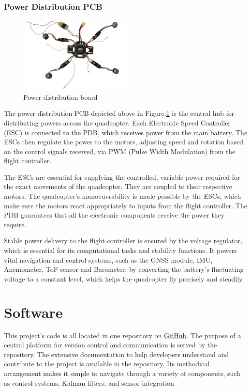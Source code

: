 \documentclass{report}
\begin{document}
\subsection{Power Distribution PCB}
\begin{figure}[H]
  \centering
  \includegraphics[width=0.5\textwidth]{Pictures/power_distribution_and_escs.png}
  \caption{Power distribution board}
  \label{fig:power_distribution}
\end{figure}
The power distribution PCB depicted above in Figure:\ref{fig:power_distribution}
is the central hub for distributing powers across the quadcopter. Each
Electronic Speed Controller (ESC) is connected to the PDB, which receives power
from the main battery. The ESCs then regulate the power to the motors, adjusting
speed and rotation based on the control signals received, via PWM (Pulse Width
Modulation) from the flight controller.

The ESCs are essential for supplying the controlled, variable power required for
the exact movements of the quadcopter. They are coupled to their respective
motors. The quadcopter's manoeuvrability is made possible by the ESCs, which
make sure the motors react appropriately to inputs from the flight controller.
The PDB guarantees that all the electronic components receive the power they
require.

Stable power delivery to the flight controller is ensured by the voltage
regulator, which is essential for its computational tasks and stability
functions. It powers vital navigation and control systems, such as the GNSS
module, IMU, Anemometer, ToF sensor and Barometer, by converting the battery's
fluctuating voltage to a constant level, which helps the quadcopter fly
precisely and steadily.


\chapter{Software}                            
This project’s code is all located in one repository on
\href{https://github.com/QUB-ASL/bzzz}{GitHub}. The purpose of a central
platform for version control and communication is served by the repository. The
extensive documentation to help developers understand and contribute to the
project is available in the repository.  Its methodical arrangement makes it
simple to navigate through a variety of components, such as control systems,
Kalman filters, and sensor integration
\end{document}
